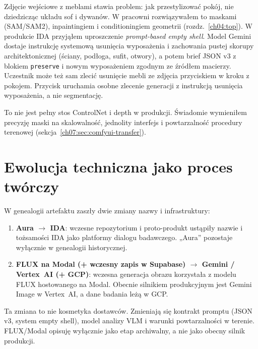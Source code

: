 Zdjęcie wejściowe z meblami stawia problem: jak przestylizować pokój, nie dziedzicząc układu sof i dywanów. W pracowni rozwiązywałem to maskami (SAM/SAM2), inpaintingiem i conditioningiem geometrii (rozdz.~\ref{ch04:top}).
W produkcie IDA przyjąłem uproszczenie \emph{prompt-based empty shell}. Model Gemini dostaje instrukcję systemową usunięcia wyposażenia i zachowania pustej skorupy architektonicznej (ściany, podłoga, sufit, otwory), a potem brief JSON v3 z blokiem \texttt{preserve} i nowym wyposażeniem zgodnym ze źródłem macierzy.
Uczestnik może też sam zlecić usunięcie mebli ze zdjęcia przyciskiem w kroku z pokojem. Przycisk uruchamia osobne zlecenie generacji z instrukcją usunięcia wyposażenia, a nie segmentację.

To nie jest pełny stos ControlNet i depth w produkcji. Świadomie wymieniłem precyzję maski na skalowalność, jednolity interfejs i powtarzalność procedury terenowej (sekcja~\ref{ch07:sec:comfyui-transfer}).

\section{Ewolucja techniczna jako proces twórczy}
\label{ch07:sec:ewolucja}

W genealogii artefaktu zaszły dwie zmiany nazwy i infrastruktury:

\begin{enumerate}
  \item \textbf{Aura $\rightarrow$ IDA}: wczesne repozytorium i proto-produkt ustąpiły nazwie i tożsamości IDA jako platformy dialogu badawczego. „Aura” pozostaje wyłącznie w genealogii historycznej.
  \item \textbf{FLUX na Modal (+ wczesny zapis w Supabase) $\rightarrow$ Gemini / Vertex~AI (+ GCP)}: wczesna generacja obrazu korzystała z modelu FLUX hostowanego na Modal. Obecnie silnikiem produkcyjnym jest Gemini Image w Vertex~AI, a dane badania leżą w GCP.
\end{enumerate}

Ta zmiana to nie kosmetyka dostawców. Zmieniają się kontrakt promptu (JSON v3, system empty shell), model analizy VLM i warunki powtarzalności w terenie. FLUX/Modal opisuję wyłącznie jako etap archiwalny, a nie jako obecny silnik produkcji.

